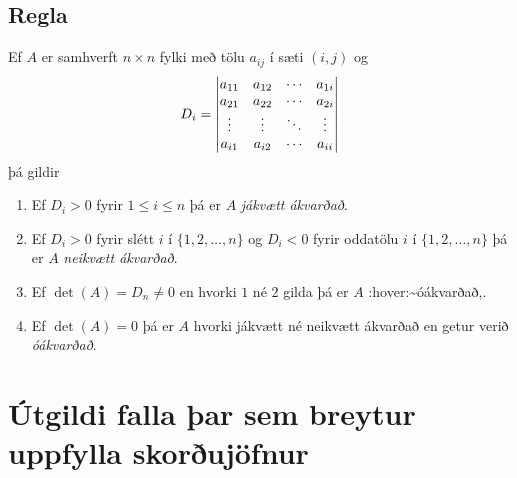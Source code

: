 \documentclass[a4paper,10pt,icelandic]{sphinxmanual}
\begin{document}
\subsection{Regla}
\label{Kafli3:regla}
Ef \(A\) er samhverft \(n \times n\) fylki með tölu
\(a_{ij}\) í sæti \((i,j)\) og
\begin{gather}
\begin{split}D_i = \begin{vmatrix}
        a_{11} & a_{12} & \cdots & a_{1i} \\
        a_{21} & a_{22} & \cdots & a_{2i} \\
        \vdots & \vdots & \ddots & \vdots \\
        a_{i1} & a_{i2} & \cdots & a_{ii}
       \end{vmatrix}\end{split}\notag
\end{gather}
þá gildir
\begin{enumerate}
\item {} 
Ef \(D_i > 0\) fyrir \(1\leq i \leq n\) þá er \(A\)
\textit{jákvætt ákvarðað}.

\item {} 
Ef \(D_i > 0\) fyrir slétt \(i\) í \(\{1,2,\ldots,n\}\)
og \(D_i < 0\) fyrir oddatölu \(i\) í
\(\{1,2,\ldots,n\}\) þá er \(A\) \textit{neikvætt ákvarðað}.

\item {} 
Ef \(\det(A) = D_n \neq 0\) en hvorki \(1\) né \(2\)
gilda þá er \(A\) :hover:\textasciitilde{}óákvarðað,.

\item {} 
Ef \(\det(A) = 0\) þá er \(A\) hvorki jákvætt né neikvætt
ákvarðað en getur verið \textit{óákvarðað}.

\end{enumerate}


\section{Útgildi falla þar sem breytur uppfylla skorðujöfnur}
\label{Kafli3:index-4}\label{Kafli3:utgildi-falla-ar-sem-breytur-uppfylla-skorujofnur}
\end{document}
